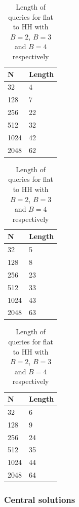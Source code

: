 \documentclass[11pt]{article}
\theoremstyle{definition}
\begin{document}
\begin{table}[H]
\centering
\begin{tabular}{|l|l|}
\hline
N    &  Length     \\ \hline
32  & 4 \\ \hline
128  & 7 \\ \hline
256  & 22 \\ \hline
512  & 32        \\ \hline
1024 & 42         \\ \hline
2048 & 62         \\ \hline
\end{tabular}
\quad
\begin{tabular}{|l|l|}
\hline
N    &  Length     \\ \hline
32  & 5 \\ \hline
128  & 8 \\ \hline
256  & 23 \\ \hline
512  & 33        \\ \hline
1024 & 43         \\ \hline
2048 & 63         \\ \hline
\end{tabular}
\quad
\begin{tabular}{|l|l|}
\hline
N    &  Length     \\ \hline
32  & 6 \\ \hline
128  & 9 \\ \hline
256  & 24 \\ \hline
512  & 35        \\ \hline
1024 & 44         \\ \hline
2048 & 64         \\ \hline
\end{tabular}
\caption{Length of queries for flat to HH with $B=2$, $B=3$ and $B=4$ respectively}
\label{hh_v_flat}
\end{table}

\subsubsection{Central solutions}
\end{document}
